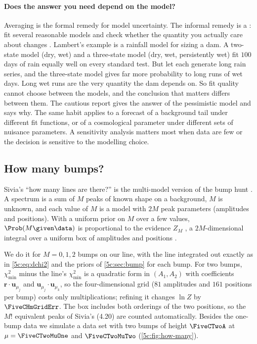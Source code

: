 \paragraph{Does the answer you need depend on the model?}
Averaging is the formal remedy for model uncertainty. The informal remedy is a
: fit several reasonable models and check whether the
quantity you actually care about changes . Lambert's example is a
rainfall model for sizing a dam. A two-state model (dry, wet) and a three-state model
(dry, wet, persistently wet) fit $100$ days of rain equally well on every standard
test. But let each generate long rain series, and the three-state model gives far more
probability to long runs of wet days. Long wet runs are the very quantity the dam
depends on. So fit quality cannot choose between the models, and the conclusion that
matters differs between them. The cautious report gives the answer of the pessimistic
model and says why. The same habit applies
to a forecast of a background tail under different fit functions, or of a cosmological
parameter under different sets of nuisance parameters. A sensitivity analysis matters
most when data are few or the decision is sensitive to the modelling choice.

\subsection{How many bumps?}
\label{5c:sec:how-many}

Sivia's ``how many lines are there?'' is the multi-model version of the bump hunt
. A spectrum is a sum of $M$ peaks of known shape on a background,
$M$ is unknown, and each value of $M$ is a model with $2M$ peak parameters (amplitudes
and positions). With a uniform prior on $M$ over a few values, $\Prob(M\given\data)$ is
proportional to the evidence $Z_M$ , a $2M$-dimensional integral
over a uniform box of amplitudes and positions .

We do it for $M=0,1,2$ bumps on our line, with the line integrated out exactly as in
\eqref{5c:eq:dchi2} and the priors of \cref{5c:sec:bump} for each bump. For two bumps,
$\chi^2_{\min}$ minus the line's $\chi^2_{\min}$ is a quadratic form in $(A_1,A_2)$
with coefficients $\bm r\cdot\bm u_{\mu_j}$ and $\bm u_{\mu_j}\cdot\bm u_{\mu_k}$, so the
four-dimensional grid ($81$ amplitudes and $161$ positions per bump) costs only
multiplications; refining it changes $\ln Z$ by $\FiveCHmGridErr$. The box includes both
orderings of the two positions, so the $M!$ equivalent peaks of Sivia's (4.20) are
counted automatically. Besides the one-bump data we simulate a data set with two bumps of
height $\FiveCTwoA$ at $\mu=\FiveCTwoMuOne$ and $\FiveCTwoMuTwo$
(\cref{5c:fig:how-many}).


